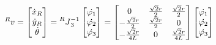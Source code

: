 \documentclass[11pt]{article}
\begin{document}
    \begin{equation}
        \label{eq:finalforward}
        \prescript{R}{}{v}=
        \begin{bmatrix}
            \dot{x}_{R} \\
            \dot{y}_{R} \\
            \dot{\theta} \\
        \end{bmatrix}
        = \prescript{R}{}{J}^{-1}_{3}
        \begin{bmatrix}
            \dot{\varphi_{1}} \\
            \dot{\varphi_{2}} \\
            \dot{\varphi_{3}} \\
        \end{bmatrix}
        =
        \begin{bmatrix}
            0 & \frac{\sqrt{2}r}{2} & \frac{\sqrt{2}r}{2} \\
            -\frac{\sqrt{2}r}{2} & \frac{\sqrt{2}r}{2} & 0 \\
            -\frac{\sqrt{2}r}{4L} & 0 & \frac{\sqrt{2}r}{4L} \\
        \end{bmatrix}
        \begin{bmatrix}
            \dot{\varphi_{1}} \\
            \dot{\varphi_{2}} \\
            \dot{\varphi_{3}} \\
        \end{bmatrix}
    \end{equation}
\end{document}
